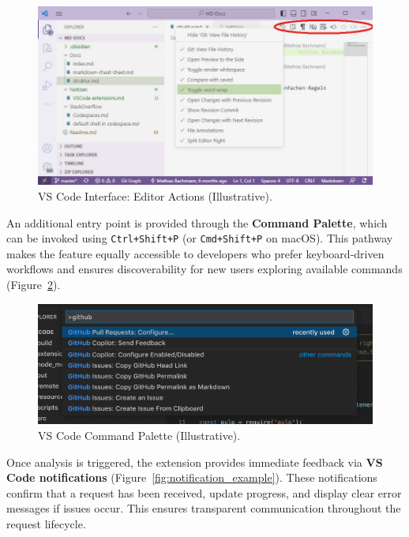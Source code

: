 \begin{spacing}{1.2}
\begin{figure}[H]
    \centering
    \includegraphics[scale=0.4]{Images/editor_actions.jpg}
    \caption{VS Code Interface: Editor Actions (Illustrative).}
    \label{fig:editor_action_implementation}
\end{figure}

An additional entry point is provided through the \textbf{Command Palette}, which can be invoked using \texttt{Ctrl+Shift+P} (or \texttt{Cmd+Shift+P} on macOS). This pathway makes the feature equally accessible to developers who prefer keyboard-driven workflows and ensures discoverability for new users exploring available commands (Figure~\ref{fig:command_palette_example}).

\begin{figure}[H]
    \centering
    \includegraphics[scale=0.5]{Images/command_palette.png}
    \caption{VS Code Command Palette (Illustrative).}
    \label{fig:command_palette_example}
\end{figure}


Once analysis is triggered, the extension provides immediate feedback via \textbf{VS Code notifications} (Figure~\ref{fig:notification_example}). These notifications confirm that a request has been received, update progress, and display clear error messages if issues occur. This ensures transparent communication throughout the request lifecycle.


\end{spacing}
